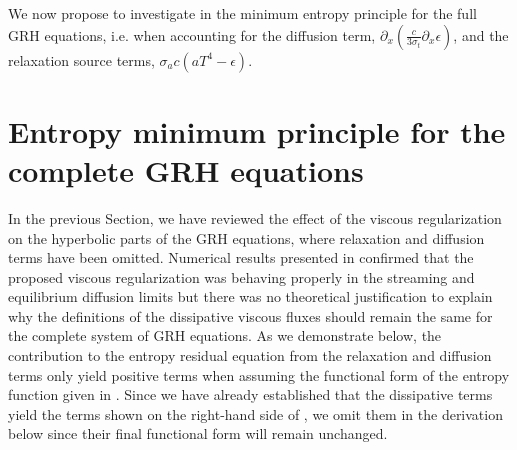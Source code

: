 \documentclass[review]{elsarticle}
\begin{document}
%
We now propose to investigate in  the minimum entropy principle for the full GRH equations, i.e. when accounting for the diffusion term, $\partial_x \left( \frac{c}{3 \sigma_t} \partial_x \epsilon \right)$, and the relaxation source terms, $\sigma_a c \left( a T^4 - \epsilon \right)$.
%
\section{Entropy minimum principle for the complete GRH equations}\label{sec:VR_new}
%
In the previous Section, we have reviewed the effect of the viscous regularization on the hyperbolic parts of the GRH equations, where relaxation and diffusion terms have been omitted. Numerical results presented in \cite{our_jcp_radhy_paper} confirmed that the proposed viscous regularization was behaving properly in the streaming and equilibrium diffusion limits but there was no theoretical justification to explain why the definitions of the dissipative viscous fluxes should remain the same for the complete system of GRH equations. As we demonstrate below, the contribution to the entropy residual equation from the relaxation and diffusion terms only yield positive terms when assuming the functional form of the entropy function given in . Since we have already established that the dissipative terms yield the terms shown on the right-hand side of , we omit them in the derivation below since their final functional form will remain unchanged.
\end{document}
